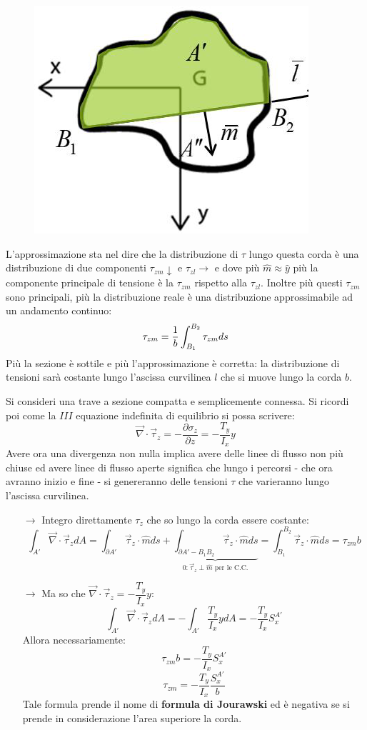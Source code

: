 \begin{figure}[H]
	\centering
	\includegraphics[width=0.5\linewidth]{immagini_6/screenshot004}
	\label{fig:screenshot004}
\end{figure}
		 
		 L'approssimazione sta nel dire che la distribuzione di $\tau$ lungo questa corda è una distribuzione di due componenti $\tau_{zm}\downarrow$ e $\tau_{zl}\rightarrow$ e dove più $\hat{m} \approx \hat{y}$ più la componente principale di tensione è la  $\tau_{zm}$ rispetto alla  $\tau_{zl}$. Inoltre più questi $\tau_{zm}$ sono principali, più la distribuzione reale è una distribuzione approssimabile ad un andamento continuo:
		 \[\tau_{zm} = {1\over b}\int_{B_1}^{B_2}\tau_{zm}ds\]
		 Più la sezione è sottile e più l'approssimazione è corretta: la distribuzione di tensioni sarà costante lungo l'ascissa curvilinea $l$ che si muove lungo la corda $b$. \newline 
		 
		 Si consideri una trave a sezione compatta e semplicemente connessa. Si ricordi poi come la $III$ equazione indefinita di equilibrio si possa scrivere: 
		 \[ \vec{\nabla}\cdot\vec{\tau}_z = -\dfrac{\partial \sigma_z}{\partial z} = -\dfrac{T_y}{I_x}y \]
		 Avere ora una divergenza non nulla implica avere delle linee di flusso non più chiuse ed avere linee di flusso aperte significa che lungo i percorsi - che ora avranno inizio e fine - si genereranno delle tensioni $\tau$ che varieranno lungo l'ascissa curvilinea. \newline 
		 
		\begin{itemize}
			 \item[$\rightarrow$] Integro direttamente $\tau_z$ che so lungo la corda essere costante:
		 \[ \int_{A'} \vec{\nabla}\cdot\vec{\tau}_z dA = \int_{\partial A'} \vec{\tau}_z \cdot \hat{m} ds + \underbrace{\int_{\partial A' -B_1B_ 2} \vec{\tau}_z \cdot \hat{m} ds}_\text{$0:\vec{\tau}_z\perp\hat{m}$ per le C.C.} = \int_{B_1}^{B_2} \vec{\tau}_z \cdot \hat{m} ds = \tau_{zm}b \]
		 \item[$\rightarrow$] Ma so che \( \vec{\nabla}\cdot\vec{\tau}_z = -\dfrac{T_y}{I_x}y\):
		 \[ \int_{A'} \vec{\nabla}\cdot\vec{\tau}_z dA = -\int_{A'}\dfrac{T_y}{I_x}ydA = -\dfrac{T_y}{I_x}S_x^{A'}\]
		 Allora necessariamente:
		 \[\tau_{zm}b = -\dfrac{T_y}{I_x}S_x^{A'} \]
		 \[ \tau_{zm} = -\dfrac{T_y}{I_x}\dfrac{S_x^{A'}}{b} \]
		 Tale formula prende il nome di \textbf{formula di Jourawski} ed è negativa se si prende in considerazione l'area superiore la corda. 
		\end{itemize} 
		 
